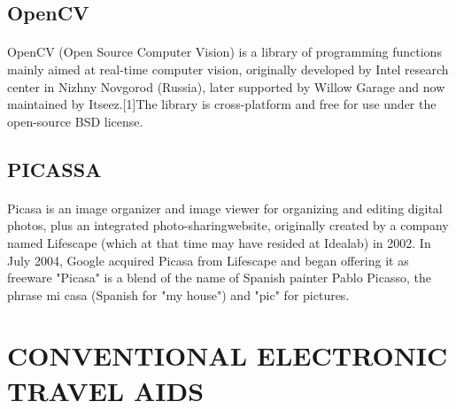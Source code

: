 \documentclass[11pt,a4paper,twoside]{report}
\begin{document}
\subsection{OpenCV}
\paragraph{ }OpenCV (Open Source Computer Vision) is a library of programming functions mainly aimed at real-time computer vision, originally developed by Intel research center in Nizhny Novgorod (Russia), later supported by Willow Garage and now maintained by Itseez.[1]The library is cross-platform and free for use under the open-source BSD license.
\subsection{PICASSA}
\paragraph{ }Picasa is an image organizer and image viewer for organizing and editing digital photos, plus an integrated photo-sharingwebsite, originally created by a company named Lifescape (which at that time may have resided at Idealab) in 2002. In July 2004, Google acquired Picasa from Lifescape and began offering it as freeware "Picasa" is a blend of the name of Spanish painter Pablo Picasso, the phrase mi casa (Spanish for "my house") and "pic" for pictures.

\section{CONVENTIONAL ELECTRONIC
TRAVEL AIDS}
\end{document}
